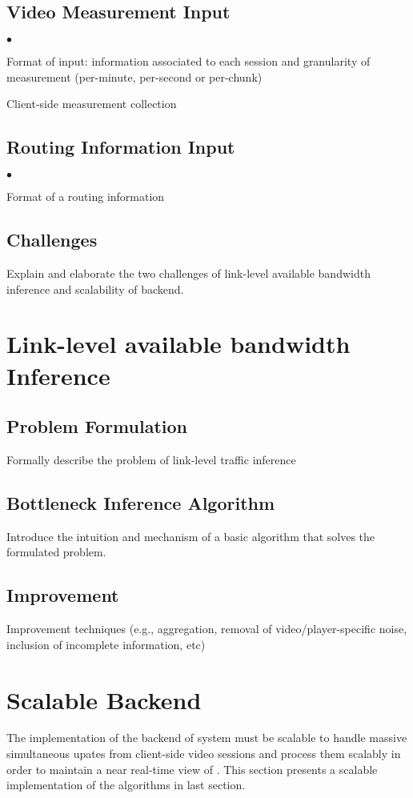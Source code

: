 \documentclass[10pt,twocolumn]{article}
\newenvironment{packeditemize}{\begin{list}{$\bullet$}{\setlength{\itemsep}{0.5pt}\addtolength{\labelwidth}{-4pt}\setlength{\leftmargin}{\labelwidth}\setlength{\listparindent}{\parindent}\setlength{\parsep}{1pt}\setlength{\topsep}{0pt}}}{\end{list}}
\begin{document}
\subsection{Video Measurement Input}
\begin{packeditemize}
	\item Format of input: information associated to each session and granularity of measurement (per-minute, per-second or per-chunk)
	\item Client-side measurement collection
\end{packeditemize}

\subsection{Routing Information Input}
\begin{packeditemize}
	\item Format of a routing information
\end{packeditemize}

\subsection{Challenges}
Explain and elaborate the two challenges of link-level available bandwidth inference and scalability of backend.

\section{Link-level available bandwidth Inference}
\subsection{Problem Formulation}
Formally describe the problem of link-level traffic inference


\subsection{Bottleneck Inference Algorithm}
Introduce the intuition and mechanism of a basic algorithm that solves the formulated problem.


\subsection{Improvement}
Improvement techniques (e.g., aggregation, removal of video/player-specific noise, inclusion of incomplete information, etc)

\section{Scalable Backend}
The implementation of the backend of \itm system must be scalable to handle massive simultaneous upates from client-side video sessions and process them scalably in order to maintain a near real-time view of \itm. This section presents a scalable implementation of the algorithms in last section.
\end{document}
